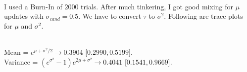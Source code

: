\documentclass{article}
\begin{document}
\pagebreak

\\

I used a Burn-In of $2000$ trials. After much tinkering, I got good mixing for $\mu$ updates with $\sigma_{cand} = 0.5.$ We have to convert $\tau$ to $\sigma^2.$ Following are trace plots for $\mu$ and $\sigma^2.$

%





\\

Mean = $e^{\mu+\sigma^2/2} \rightarrow 0.3904$ [$0.2990,0.5199$].\\

Variance = $\left(e^{\sigma^2}-1\right)e^{2\mu+\sigma^2} \rightarrow 0.4041$ [$0.1541,0.9669$].\\

\pagebreak
{}\\

\end{document}
